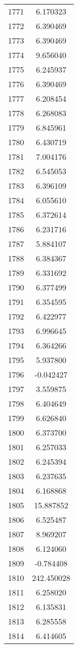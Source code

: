 \documentclass[12pt]{article}
\begin{document}
\begin{longtable}{@{}cc@{}}
1771 & 6.170323 \\
1772 & 6.390469 \\
1773 & 6.390469 \\
1774 & 9.656040 \\
1775 & 6.245937 \\
1776 & 6.390469 \\
1777 & 6.208454 \\
1778 & 6.268083 \\
1779 & 6.845961 \\
1780 & 6.430719 \\
1781 & 7.004176 \\
1782 & 6.545053 \\
1783 & 6.396109 \\
1784 & 6.055610 \\
1785 & 6.372614 \\
1786 & 6.231716 \\
1787 & 5.884107 \\
1788 & 6.384367 \\
1789 & 6.331692 \\
1790 & 6.377499 \\
1791 & 6.354595 \\
1792 & 6.422977 \\
1793 & 6.996645 \\
1794 & 6.364266 \\
1795 & 5.937800 \\
1796 & -0.042427 \\
1797 & 3.559875 \\
1798 & 6.404649 \\
1799 & 6.626840 \\
1800 & 6.373700 \\
1801 & 6.257033 \\
1802 & 6.245394 \\
1803 & 6.237635 \\
1804 & 6.168868 \\
1805 & 15.887852 \\
1806 & 6.525487 \\
1807 & 8.969207 \\
1808 & 6.124060 \\
1809 & -0.784408 \\
1810 & 242.450028 \\
1811 & 6.258020 \\
1812 & 6.135831 \\
1813 & 6.285558 \\
1814 & 6.414605 \\

\end{longtable}
\end{document}
